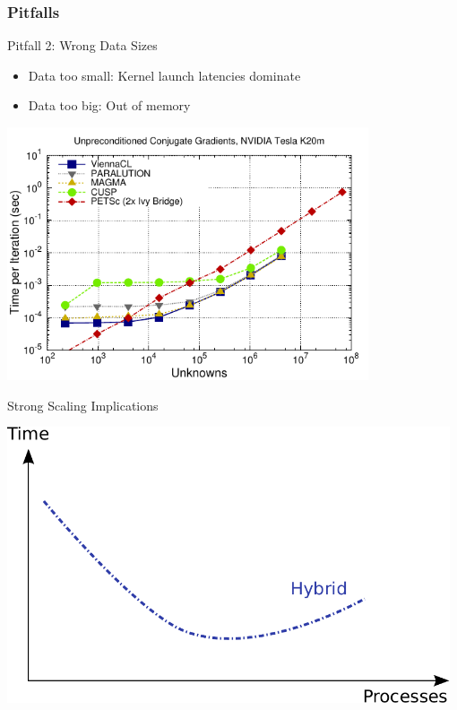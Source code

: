 \begin{frame}[fragile]
\frametitle{Pitfalls}
  
  \begin{block}{Pitfall 2: Wrong Data Sizes}
  \begin{itemize}
   \item Data too small: Kernel launch latencies dominate
   \item Data too big: Out of memory
  \end{itemize}
  \end{block}

\begin{center} \vspace*{-0.5cm}
 \includegraphics[width=0.8\textwidth]{figures/time-laplace2d-K20m-cg}
\end{center}

\end{frame}



\begin{frame}{Strong Scaling Implications}
\begin{center}
 \includegraphics[width=0.98\textwidth]{figures/strong-scaling-1}
\end{center}
\end{frame}

